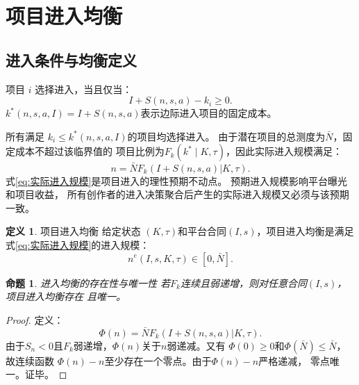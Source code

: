 \documentclass[UTF8, a4paper, 12pt, fontset=fandol]{ctexart}
\newtheorem{proposition}[theorem]{命题}
\theoremstyle{definition}
\newtheorem{definition}{定义}[section]
\theoremstyle{remark}
\begin{document}
\section{项目进入均衡}
\subsection{进入条件与均衡定义}
项目 $i$ 选择进入，当且仅当：
\begin{equation*}
  I+S(n,s,a)-k_i\ge 0.
\end{equation*}
$k^*(n,s,a,I)=I+S(n,s,a)$表示边际进入项目的固定成本。

所有满足
$k_i\leq k^*(n,s,a,I)$的项目均选择进入。
由于潜在项目的总测度为$\bar N$，固定成本不超过该临界值的
项目比例为$F_k(k^*\mid K,\tau)$，因此实际进入规模满足：
\begin{equation}
  n = \bar{N}F_k(I+S(n,s,a)|K,\tau).
  \label{eq:实际进入规模}
\end{equation}
式\eqref{eq:实际进入规模}是项目进入的理性预期不动点。
预期进入规模影响平台曝光和项目收益，
所有创作者的进入决策聚合后产生的实际进入规模又必须与该预期一致。
\begin{definition}{项目进入均衡}
  给定状态 $(K,\tau)$和平台合同$(I,s)$，项目进入均衡是满足
  式\eqref{eq:实际进入规模}的进入规模：
  \begin{equation*}
    n^e(I,s,K,\tau)\in [0,\bar{N}].
  \end{equation*}
\end{definition}
\begin{proposition}{进入均衡的存在性与唯一性}
  若$F_k$连续且弱递增，则对任意合同$(I,s)$，项目进入均衡存在
  且唯一。
\end{proposition}
\begin{proof}
  定义：
  \begin{equation*}
    \Phi(n)=\bar{N}F_k(I+S(n,s,a)|K,\tau).
  \end{equation*}
  由于$S_n<0$且$F_k$弱递增，$\Phi(n)$关于$n$弱递减。又有
  $\Phi(0)\ge 0$和$\Phi(\bar{N})\le \bar{N}$，故连续函数
  $\Phi(n)-n$至少存在一个零点。由于$\Phi(n)-n$严格递减，
  零点唯一。证毕。
\end{proof}
\end{document}

